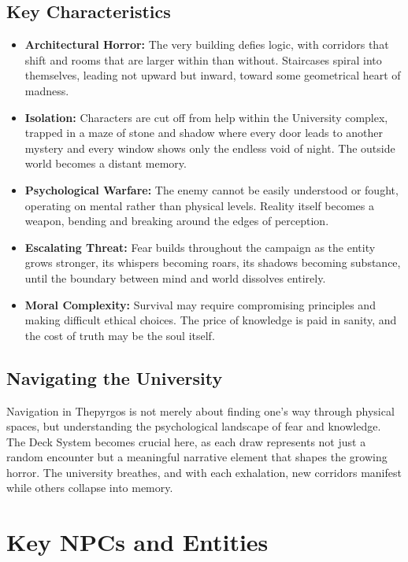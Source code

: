 \documentclass[11pt]{article}
\begin{document}
\subsection{Key Characteristics}

\begin{itemize}
\item \textbf{Architectural Horror:} The very building defies logic, with corridors that shift and rooms that are larger within than without. Staircases spiral into themselves, leading not upward but inward, toward some geometrical heart of madness.
\item \textbf{Isolation:} Characters are cut off from help within the University complex, trapped in a maze of stone and shadow where every door leads to another mystery and every window shows only the endless void of night. The outside world becomes a distant memory.
\item \textbf{Psychological Warfare:} The enemy cannot be easily understood or fought, operating on mental rather than physical levels. Reality itself becomes a weapon, bending and breaking around the edges of perception.
\item \textbf{Escalating Threat:} Fear builds throughout the campaign as the entity grows stronger, its whispers becoming roars, its shadows becoming substance, until the boundary between mind and world dissolves entirely.
\item \textbf{Moral Complexity:} Survival may require compromising principles and making difficult ethical choices. The price of knowledge is paid in sanity, and the cost of truth may be the soul itself.
\end{itemize}

\subsection{Navigating the University}

Navigation in Thepyrgos is not merely about finding one's way through physical spaces, but understanding the psychological landscape of fear and knowledge. The Deck System becomes crucial here, as each draw represents not just a random encounter but a meaningful narrative element that shapes the growing horror. The university breathes, and with each exhalation, new corridors manifest while others collapse into memory.

\section{Key NPCs and Entities}
\end{document}
